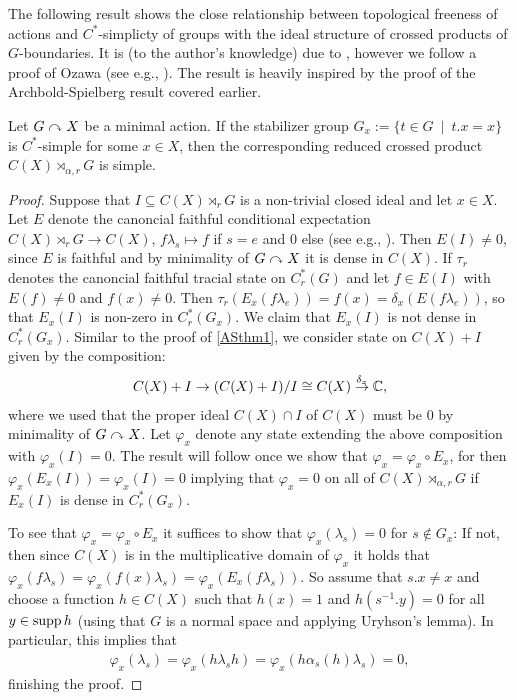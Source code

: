 The following result shows the close relationship between topological freeness of actions and $C^*$-simplicty of groups with the ideal structure of crossed products of $G$-boundaries. It is (to the author's knowledge) due to \cite{breuillard2017c}, however we follow a proof of Ozawa (see e.g., \cite{ozawa2014lecture}). The result is heavily inspired by the proof of the Archbold-Spielberg result covered earlier.
\begin{proposition}
	Let $G \stackrel{}{\curvearrowright} X$ be a minimal action. If the stabilizer group $G_x := \{ t \in G \ \mid \ t.x =x\}$ is $C^*$-simple for some $x \in X$, then the corresponding reduced crossed product $C(X) \rtimes_{\alpha,r} G$ is simple.
	\label{ozawa15pt1}
\end{proposition}
\begin{proof}
	Suppose that $I \subseteq C(X) \rtimes_r G$ is a non-trivial closed ideal and let $x \in X$. Let $E$ denote the canoncial faithful conditional expectation $C(X) \rtimes_r G \to C(X)$, $f \lambda_s \mapsto f$ if $s  = e$ and $0$ else (see e.g., \cite[proposition 4.1.9]{brown2008c}). Then $E(I) \neq 0$, since $E$ is faithful and by minimality of $G \stackrel{}{\curvearrowright} X$ it is dense in $C(X)$. If $\tau_r$ denotes the canoncial faithful tracial state on $C_r^*(G)$ and let $f \in E(I)$ with $E(f) \neq 0$ and $f(x) \neq 0$. Then $\tau_r (E_x(f \lambda_e))= f(x) = \delta_x(E(f\lambda_e))$, so that $E_x(I)$ is non-zero in $C_r^*(G_x)$. We claim that $E_x(I)$ is not dense in $C_r^*(G_x)$. Similar to the proof of \cref{ASthm1}, we consider state on $C(X) + I$ given by the composition:
	\begin{align*}
		C(X) + I \to (C(X)+I)/I \cong C(X) \stackrel {\delta_x} \to \mathbb{C},
	\end{align*}
	where we used that the proper ideal $C(X) \cap I$ of $C(X)$ must be $0$ by minimality of $G \stackrel{}{\curvearrowright} X$. Let $\varphi_x$ denote any state extending the above composition with $\varphi_x(I) =0$. The result will follow once we show that $\varphi_x = \varphi_x \circ E_x$, for then $\varphi_x (E_x(I)) = \varphi_x(I) = 0 $ implying that $\varphi_x= 0$ on all of $C(X) \rtimes_{\alpha,r}G$ if $E_x(I)$ is dense in $C_r^*(G_x)$. 

	To see that $\varphi_x = \varphi_x \circ E_x$ it suffices to show that $\varphi_x (\lambda_s) = 0$ for $s \not \in G_x$: If not, then since $C(X)$ is in the multiplicative domain of $\varphi_x$ it holds that $\varphi_x(f \lambda_s) =  \varphi_x( f(x) \lambda_s)  =  \varphi_x (E_x( f\lambda_s))$. So assume that $s.x \neq x$ and choose a function $h \in C(X)$ such that $h(x) = 1$ and $h(s^{-1}.y) = 0$ for all $y \in \operatorname{supp} h$ (using that $G$ is a normal space and applying Uryhson's lemma). In particular, this implies that 
	\begin{align*}
		\varphi_x(\lambda_s) = \varphi_x(h\lambda_sh) = \varphi_x(h \alpha_s(h)\lambda_s)   = 0,
	\end{align*}
	finishing the proof.
\end{proof}
